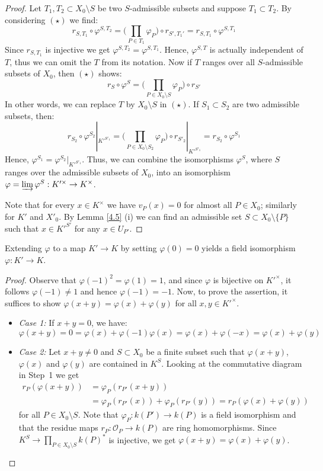 \begin{proof}
Let $T_1, T_2\subset X_0\setminus S$ be two $S$-admissible subsets and suppose $T_1\subset T_2$. By considering $(\star)$ we find:
\[ r_{S,T_1}\circ\varphi^{S,T_2}=\Big(\prod_{P\in T_1}\varphi_P\Big)\circ r_{S',T_1'} = r_{S,T_1}\circ\varphi^{S,T_1} \]
Since $r_{S,T_1}$ is injective we get $\varphi^{S,T_2}=\varphi^{S,T_1}$. Hence, $\varphi^{S,T}$ is actually independent of $T$, thus we can omit the $T$ from its notation. Now if $T$ ranges over all $S$-admissible subsets of $X_0$, then $(\star)$ shows:
\[ r_S\circ\varphi^S = \Big(\prod_{P\in X_0\setminus S}\varphi_P \Big)\circ r_{S'} \]
In other words, we can replace $T$ by $X_0\setminus S$ in $(\star)$. If $S_1\subset S_2$ are two admissible subsets, then:
\[ r_{S_2}\circ\varphi^{S_2}|_{K'^{S'_1}} = \Big(\prod_{P\in X_0\setminus S_2}\varphi_P \Big)\circ r_{S'_2}|_{K'^{S'_1}} = r_{S_2}\circ\varphi^{S_1} \]
Hence, $\varphi^{S_1}=\varphi^{S_2}|_{K'^{S'_1}}$. Thus, we can combine the isomorphisms $\varphi^S$, where $S$ ranges over the admissible subsets of $X_0$, into an isomorphism $\varphi = \varinjlim \varphi^S: K'^\times \to K^\times$. 

Note that for every $x\in K^\times$ we have $v_P(x)= 0$ for almost all $P\in X_0$; similarly for $K'$ and $X'_0$. By Lemma \ref{4.5} (i) we can find an admissible set $S\subset X_0\setminus \{P\}$ such that $x\in K'^{S'}$ for any $x\in U_{P'}$.
\end{proof}

\begin{step}
Extending $\varphi$ to a map $K'\to K$ by setting $\varphi(0)=0$ yields a field isomorphism $\varphi:K'\to K$.
\end{step}

\begin{proof}
Observe that $\varphi(-1)^2 = \varphi(1) = 1$, and since $\varphi$ is bijective on $K'^\times$, it follows $\varphi(-1) \neq 1$ and hence $\varphi(-1) = -1$. Now, to prove the assertion, it suffices to show $\varphi(x + y) = \varphi(x) + \varphi(y)$ for all $x,y\in K'^\times$.
\begin{itemize}
\item \textit{Case 1:} If $x + y = 0$, we have:
\[ \varphi(x + y) = 0 = \varphi(x) + \varphi(-1)\varphi(x) = \varphi(x) + \varphi(-x) = \varphi(x) + \varphi(y) \]
\item \textit{Case 2:} Let $x + y\neq 0$ and $S\subset X_0$ be a finite subset such that $\varphi(x + y)$, $\varphi(x)$ and $\varphi(y)$ are contained in $K^S$. Looking at the commutative diagram in \mbox{Step 1} we get
\begin{align*}
r_P(\varphi(x+ y)) &= \varphi_P(r_{P'}(x + y)) \\
&= \varphi_P(r_{P'}(x)) + \varphi_P(r_{P'}(y)) = r_P(\varphi(x) + \varphi(y))
\end{align*}
for all $P\in X_0\setminus S$. Note that $\varphi_P: k(P')\to k(P)$ is a field isomorphism and that the residue maps $r_{P}: \mathcal{O}_{P} \to k(P)$ are ring homomorphisms. Since $K^S\to \prod_{P\in X_0\setminus S} k(P)^\ast$ is injective, we get $\varphi(x+y) = \varphi(x) + \varphi(y)$.\qedhere
\end{itemize}
\end{proof}

